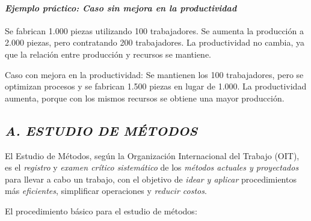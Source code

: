\documentclass[a4paper,oneside,11pt]{article}
\begin{document}
\paragraph{\textit{Ejemplo práctico: Caso sin mejora en la productividad}}

Se fabrican 1.000 piezas utilizando 100 trabajadores.
Se aumenta la producción a 2.000 piezas, pero contratando 200 trabajadores.
La productividad no cambia, ya que la relación entre producción y recursos se mantiene.

Caso con mejora en la productividad:
Se mantienen los 100 trabajadores, pero se optimizan procesos y se fabrican 1.500 piezas en lugar de 1.000.
La productividad aumenta, porque con los mismos recursos se obtiene una mayor producción.


\subsection{\textit{A. ESTUDIO DE MÉTODOS}}

El Estudio de Métodos, según la Organización Internacional del Trabajo (OIT), es el \textit{registro} y \textit{examen crítico sistemático} de los \textit{métodos actuales y proyectados} para llevar a cabo un trabajo, con el objetivo de \textit{idear y aplicar} procedimientos más \textit{eficientes}, simplificar operaciones y \textit{reducir costos}.

El procedimiento básico para el estudio de métodos:
\end{document}
